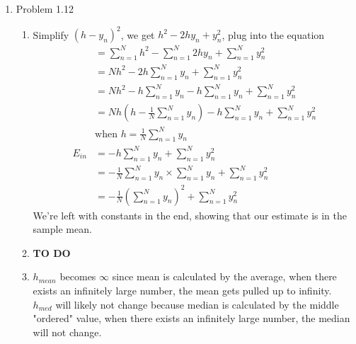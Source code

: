 \documentclass{article}
\begin{document}
\begin{enumerate}
        \item Problem 1.12
        \begin{enumerate}[label=(\alph*)]
            \item Simplify $(h - y_n)^2$, we get $h^2 - 2hy_n + y_n^2$, plug into the equation
            \begin{align*}
                &= \sum_{n = 1}^{N}h^2 - \sum_{n = 1}^{N}2hy_n + \sum_{n = 1}^{N}y_n^2\\
                &= Nh^2 - 2h\sum_{n = 1}^{N}y_n + \sum_{n = 1}^{N}y_n^2\\
                &= Nh^2 - h\sum_{n = 1}^{N}y_n - h\sum_{n = 1}^{N}y_n + \sum_{n = 1}^{N}y_n^2\\
                &= Nh(h - \frac{1}{N}\sum_{n = 1}^{N}y_n) - h\sum_{n = 1}^{N}y_n + \sum_{n = 1}^{N}y_n^2\\
                &\text{when } h = \frac{1}{N}\sum_{n = 1}^{N}y_n\\
                E_{in} &= -h\sum_{n = 1}^{N}y_n + \sum_{n = 1}^{N}y_n^2\\
                &= -\frac{1}{N}\sum_{n = 1}^{N}y_n \times \sum_{n = 1}^{N}y_n + \sum_{n = 1}^{N}y_n^2\\
                &= -\frac{1}{N}(\sum_{n = 1}^{N}y_n)^2 + \sum_{n = 1}^{N}y_n^2
            \end{align*}
            We're left with constants in the end, showing that our estimate is in the sample mean.
            \item \textbf{TO DO}
            \item $h_{mean}$ becomes $\infty$ since mean is calculated by the average, when there exists an infinitely large number, the mean gets pulled up to infinity.\\[0.25in]
            $h_{med}$ will likely not change because median is calculated by the middle "ordered" value, when there exists an infinitely large number, the median will not change.
        \end{enumerate}
    \end{enumerate}
\end{document}
